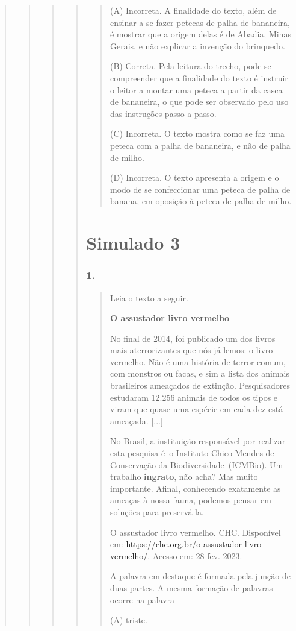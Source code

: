 \begin{quote}
\begin{quote}
\begin{quote}
\begin{quote}
\begin{quote}
(A) Incorreta. A finalidade do texto, além de ensinar a se fazer petecas
de palha de bananeira, é mostrar que a origem delas é de Abadia, Minas
Gerais, e não explicar a invenção do brinquedo.

(B) Correta. Pela leitura do trecho, pode-se compreender que a
finalidade do texto é instruir o leitor a montar uma peteca a partir da
casca de bananeira, o que pode ser observado pelo uso das instruções
passo a passo.

(C) Incorreta. O texto mostra como se faz uma peteca com a palha de
bananeira, e não de palha de milho.

(D) Incorreta. O texto apresenta a origem e o modo de se confeccionar
uma peteca de palha de banana, em oposição à peteca de palha de milho.
\end{quote}

\section{Simulado 3}\label{simulado-3}

\subsubsection{1. }\label{section-88}

\begin{quote}
Leia o texto a seguir.

\textbf{O assustador livro vermelho}

No final de 2014, foi publicado um dos livros mais aterrorizantes que
nós já lemos: o livro vermelho. Não é uma história de terror comum, com
monstros ou facas, e sim a lista dos animais brasileiros ameaçados de
extinção. Pesquisadores estudaram 12.256 animais de todos os tipos e
viram que quase uma espécie em cada dez está ameaçada. {[}...{]}

No Brasil, a instituição responsável por realizar esta pesquisa é~o
Instituto Chico Mendes de Conservação da Biodiversidade~(ICMBio). Um
trabalho \textbf{ingrato}, não acha? Mas muito importante. Afinal,
conhecendo exatamente as ameaças à nossa fauna, podemos pensar em
soluções para preservá-la.

O assustador livro vermelho. CHC. Disponível em:
\url{https://chc.org.br/o-assustador-livro-vermelho/}. Acesso em: 28
fev. 2023.

A palavra em destaque é formada pela junção de duas partes. A mesma
formação de palavras ocorre na palavra

(A) triste.


\end{quote}
\end{quote}
\end{quote}
\end{quote}
\end{quote}
